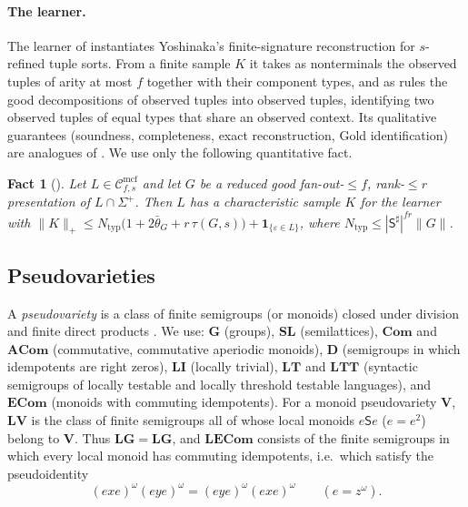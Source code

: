 \documentclass[11pt]{article}
\numberwithin{equation}{section}
\theoremstyle{plain}
\newtheorem{fact}[theorem]{Fact}
\theoremstyle{definition}
\theoremstyle{remark}
\theoremstyle{plain}
\newcommand{\Cmcf}[2]{\mathcal{C}^{\mathrm{mcf}}_{#1,#2}}
\newcommand{\eps}{\varepsilon}
\newcommand{\LG}{\mathbf{LG}}
\newcommand{\LI}{\mathbf{LI}}
\newcommand{\SL}{\mathbf{SL}}
\newcommand{\Gp}{\mathbf{G}}
\newcommand{\Dd}{\mathbf{D}}
\newcommand{\ECom}{\mathbf{ECom}}
\newcommand{\LECom}{\mathbf{L}\mathbf{ECom}}
\newcommand{\LT}{\mathbf{LT}}
\newcommand{\LTT}{\mathbf{LTT}}
\newcommand{\ACom}{\mathbf{ACom}}
\newcommand{\Com}{\mathbf{Com}}
\newcommand{\bth}{\bar\theta}
\begin{document}
\paragraph{The learner.}
The learner of \cite{KuriyamaMCFGpreprint,KuriyamaCompendium} instantiates
Yoshinaka's finite-signature reconstruction \cite{Yoshinaka2015General} for
$s$-refined tuple sorts.  From a finite sample $K$ it takes as nonterminals the
observed tuples of arity at most $f$ together with their component types, and
as rules the good decompositions of observed tuples into observed tuples,
identifying two observed tuples of equal types that share an observed context.
Its qualitative guarantees (soundness, completeness, exact reconstruction,
Gold identification) are analogues of \cite{Yoshinaka2011,Yoshinaka2015General}.
We use only the following quantitative fact.

\begin{fact}[{\cite[Thm.~\textit{data-from-typed-thickness} and
Cor.~\textit{distribution-representatives}]{KuriyamaCompendium}}]
\label{fact:char-data}
Let $L\in\Cmcf{f}{s}$ and let $G$ be a reduced good fan-out-$\le f$,
rank-$\le r$ presentation of $L\cap\Sigma^+$.  Then $L$ has a characteristic
sample $K$ for the learner with
$\|K\|_+\le N_{\mathrm{typ}}\bigl(1+2\bth_G+r\,\tau(G,s)\bigr)+\mathbf
1_{\{\eps\in L\}}$, where $N_{\mathrm{typ}}\le|\mathsf S^\sharp|^{fr}\|G\|$.
\end{fact}

\subsection{Pseudovarieties}

A \emph{pseudovariety} is a class of finite semigroups (or monoids) closed under
division and finite direct products \cite{Pin1986}.  We use: $\Gp$ (groups), $\SL$
(semilattices), $\Com$ and $\ACom$ (commutative, commutative aperiodic monoids),
$\Dd$ (semigroups in which idempotents are right zeros), $\LI$ (locally
trivial), $\LT$ and $\LTT$ (syntactic semigroups of locally testable and locally
threshold testable languages), and $\ECom$ (monoids with commuting idempotents).
For a monoid pseudovariety $\mathbf V$, $\mathbf L\mathbf V$ is the class of
finite semigroups all of whose local monoids $e\mathsf Se$ ($e=e^2$) belong to
$\mathbf V$.  Thus $\LG=\mathbf L\Gp$, and $\LECom$ consists of the finite
semigroups in which every local monoid has commuting idempotents, i.e.\ which
satisfy the pseudoidentity
\[
  (exe)^\omega(eye)^\omega=(eye)^\omega(exe)^\omega\qquad(e=z^\omega).
\]
\end{document}
